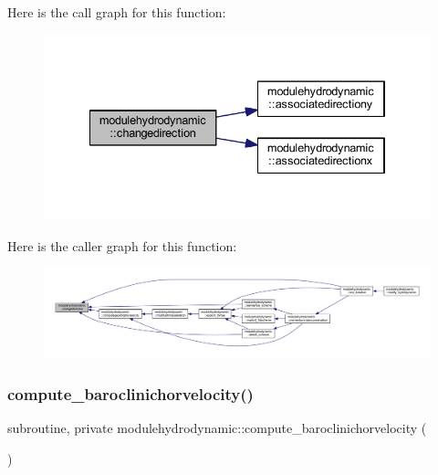 Here is the call graph for this function\+:\nopagebreak
\begin{figure}[H]
\begin{center}
\leavevmode
\includegraphics[width=334pt]{namespacemodulehydrodynamic_a21da40cf926fb3d12ccc40743a115da6_cgraph}
\end{center}
\end{figure}
Here is the caller graph for this function\+:\nopagebreak
\begin{figure}[H]
\begin{center}
\leavevmode
\includegraphics[width=350pt]{namespacemodulehydrodynamic_a21da40cf926fb3d12ccc40743a115da6_icgraph}
\end{center}
\end{figure}
\mbox{\label{namespacemodulehydrodynamic_a5548f1e73131ae2e60c1386848706e83}} 
\subsubsection{\texorpdfstring{compute\+\_\+baroclinichorvelocity()}{compute\_baroclinichorvelocity()}}
{\footnotesize\ttfamily subroutine, private modulehydrodynamic\+::compute\+\_\+baroclinichorvelocity (\begin{DoxyParamCaption}{ }\end{DoxyParamCaption})\hspace{0.3cm}{\ttfamily [private]}}

